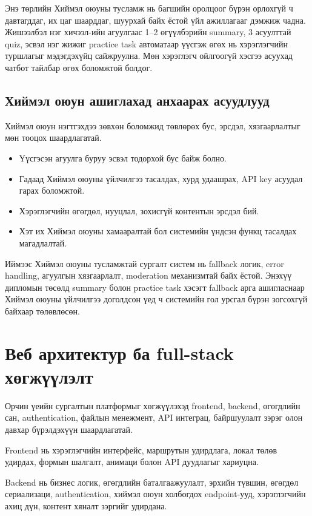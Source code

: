 Энэ төрлийн Хиймэл оюуны тусламж нь багшийн оролцоог бүрэн орлохгүй ч давтагддаг, их цаг шаарддаг, шуурхай байх ёстой үйл ажиллагааг дэмжиж чадна. Жишээлбэл нэг хичээл-ийн агуулгаас 1--2 өгүүлбэрийн summary, 3 асуулттай quiz, эсвэл нэг жижиг practice task автоматаар үүсгэж өгөх нь хэрэглэгчийн туршлагыг мэдэгдэхүйц сайжруулна. Мөн хэрэглэгч ойлгоогүй хэсгээ асуухад чатбот тайлбар өгөх боломжтой болдог.

\subsection{Хиймэл оюун ашиглахад анхаарах асуудлууд}
Хиймэл оюун нэгтгэхдээ зөвхөн боломжид төвлөрөх бус, эрсдэл, хязгаарлалтыг мөн тооцох шаардлагатай.
\begin{itemize}
\item Үүсгэсэн агуулга буруу эсвэл тодорхой бус байж болно.
\item Гадаад Хиймэл оюуны үйлчилгээ тасалдах, хурд удаашрах, API key асуудал гарах боломжтой.
\item Хэрэглэгчийн өгөгдөл, нууцлал, зохисгүй контентын эрсдэл бий.
\item Хэт их Хиймэл оюуны хамааралтай бол системийн үндсэн функц тасалдах магадлалтай.
\end{itemize}

Иймээс Хиймэл оюуны тусламжтай сургалт систем нь fallback логик, error handling, агуулгын хязгаарлалт, moderation механизмтай байх ёстой. Энэхүү дипломын төсөлд summary болон practice task хэсэгт fallback арга ашигласнаар Хиймэл оюуны үйлчилгээ доголдсон үед ч системийн гол урсгал бүрэн зогсохгүй байхаар төлөвлөсөн.

\section{Веб архитектур ба full-stack хөгжүүлэлт}

Орчин үеийн сургалтын платформыг хөгжүүлэхэд frontend, backend, өгөгдлийн сан, authentication, файлын менежмент, API интеграц, байршуулалт зэрэг олон давхар бүрэлдэхүүн шаардлагатай.

Frontend нь хэрэглэгчийн интерфейс, маршрутын удирдлага, локал төлөв  удирдах, формын шалгалт, анимаци болон API дуудлагыг хариуцна.

Backend нь бизнес логик, өгөгдлийн баталгаажуулалт, эрхийн түвшин, өгөгдөл сериализаци, authentication, хиймэл оюун холбогдох endpoint-ууд, хэрэглэгчийн ахиц дүн, контент хяналт зэргийг удирдана.

